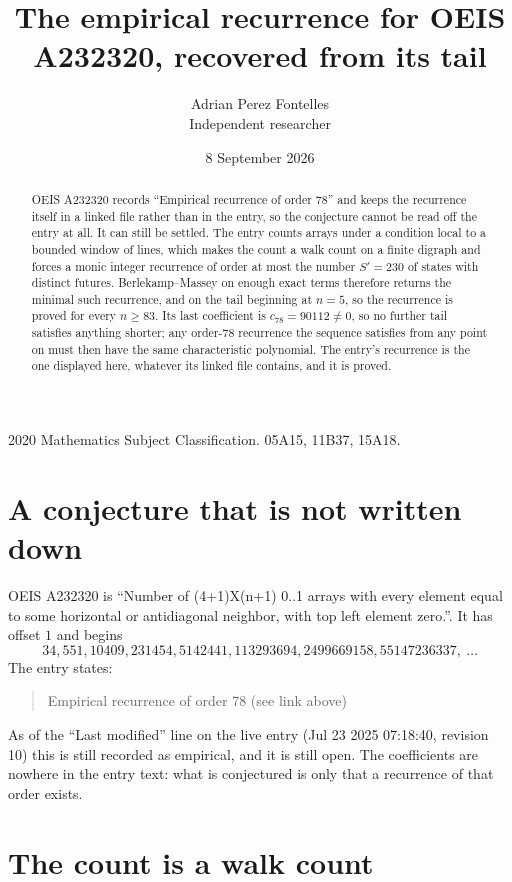 \documentclass[11pt,a4paper]{article}
\title{The empirical recurrence for OEIS A232320, recovered from its tail}
\author{Adrian Perez Fontelles\\ \small Independent researcher}
\date{8 September 2026}
\theoremstyle{plain}
\theoremstyle{definition}
\begin{document}
\maketitle

\begin{abstract}
OEIS A232320 records ``Empirical recurrence of order $78$'' and keeps the recurrence itself in
a linked file rather than in the entry, so the conjecture cannot be read off the entry at all.
It can still be settled. The entry counts arrays under a condition local to a bounded window of
lines, which makes the count a walk count on a finite digraph and forces a monic integer
recurrence of order at most the number $S'=230$ of states with distinct futures. Berlekamp--Massey on
enough exact terms therefore returns the minimal such recurrence, and on the tail beginning at $n=5$, so the recurrence is proved for every $n\ge83$.
Its last coefficient is $c_{78}=90112\neq0$, so no further tail satisfies anything
shorter; any order-$78$ recurrence the sequence satisfies from any point on must then have
the same characteristic polynomial. The entry's recurrence is the one displayed here, whatever
its linked file contains, and it is proved.
\end{abstract}

\noindent\small 2020 Mathematics Subject Classification. 05A15, 11B37, 15A18.\normalsize

\section{A conjecture that is not written down}

OEIS A232320 is ``Number of (4+1)X(n+1) 0..1 arrays with every element equal to some horizontal or antidiagonal neighbor, with top left element zero.''. It has offset $1$ and begins
\[
34, 551, 10409, 231454, 5142441, 113293694, 2499669158, 55147236337,\ \dots
\]
The entry states:
\begin{quote}
Empirical recurrence of order 78 (see link above)
\end{quote}
As of the ``Last modified'' line on the live entry (Jul 23 2025 07:18:40, revision 10)
this is still recorded as empirical, and it is still open. The coefficients are nowhere in the
entry text: what is conjectured is only that a recurrence of that order exists.

\section{The count is a walk count}
\end{document}
